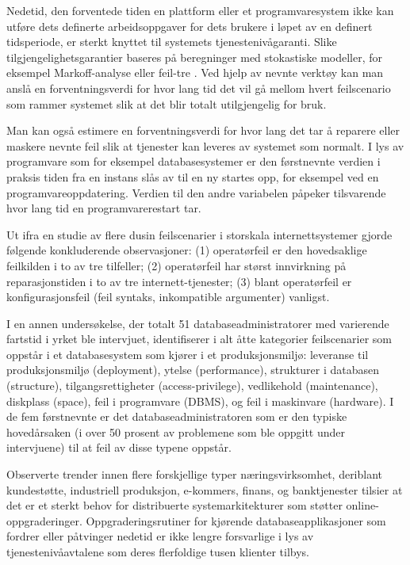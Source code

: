 Nedetid, den forventede tiden en plattform eller et programvaresystem ikke kan utføre dets definerte arbeidsoppgaver for dets brukere i løpet av en definert tidsperiode, er sterkt knyttet til systemets tjenestenivågaranti. Slike tilgjengelighetsgarantier baseres på beregninger med stokastiske modeller, for eksempel Markoff-analyse eller feil-tre \citep{BCK2013}. Ved hjelp av nevnte verktøy kan man anslå en forventningsverdi for hvor lang tid det vil gå mellom hvert feilscenario som rammer systemet slik at det blir totalt utilgjengelig for bruk. 

Man kan også estimere en forventningsverdi for hvor lang det tar å reparere eller maskere nevnte feil slik at tjenester kan leveres av systemet som normalt. I lys av programvare som for eksempel databasesystemer er den førstnevnte verdien i praksis tiden fra en instans slås av til en ny startes opp, for eksempel ved en programvareoppdatering. Verdien til den andre variabelen påpeker tilsvarende hvor lang tid en programvarerestart tar.

Ut ifra en studie av flere dusin feilscenarier i storskala internettsystemer gjorde \cite{oppenheimer2003internet} følgende konkluderende observasjoner: (1) operatørfeil er den hovedsaklige feilkilden i to av tre tilfeller; (2) operatørfeil har størst innvirkning på reparasjonstiden i to av tre internett-tjenester; (3) blant operatørfeil er konfigurasjonsfeil (feil syntaks, inkompatible argumenter) vanligst.

I en annen undersøkelse, der totalt 51 databaseadministratorer med varierende fartstid i yrket ble intervjuet, identifiserer \cite{oliveira2006understanding} i alt åtte kategorier feilscenarier som oppstår i et databasesystem som kjører i et produksjonsmiljø: leveranse til produksjonsmiljø (deployment), ytelse (performance), strukturer i databasen (structure), tilgangsrettigheter (access-privilege), vedlikehold (maintenance), diskplass (space), feil i programvare (DBMS), og feil i maskinvare (hardware). I de fem førstnevnte er det databaseadministratoren som er den typiske hovedårsaken (i over 50 prosent av problemene som ble oppgitt under intervjuene) til at feil av disse typene oppstår.

Observerte trender innen flere forskjellige typer næringsvirksomhet, deriblant kundestøtte, industriell produksjon, e-kommers, finans, og banktjenester \citep{dumitras2010upgrade, choi2009} tilsier at det er et sterkt behov for distribuerte systemarkitekturer som støtter online-oppgraderinger. Oppgraderingsrutiner for kjørende databaseapplikasjoner som fordrer eller påtvinger nedetid er ikke lengre forsvarlige i lys av tjenestenivåavtalene som deres flerfoldige tusen klienter tilbys.

